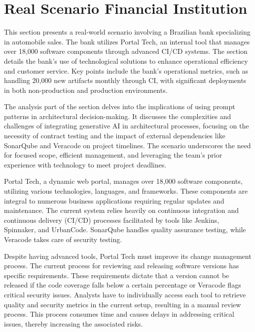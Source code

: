 \section{Real Scenario Financial Institution}
This section presents a real-world scenario involving a Brazilian bank specializing in automobile sales. The bank utilizes Portal Tech, an internal tool that manages over 18,000 software components through advanced CI/CD systems. The section details the bank's use of technological solutions to enhance operational efficiency and customer service. Key points include the bank's operational metrics, such as handling 20,000 new artifacts monthly through CI, with significant deployments in both non-production and production environments.

The analysis part of the section delves into the implications of using prompt patterns in architectural decision-making. It discusses the complexities and challenges of integrating generative AI in architectural processes, focusing on the necessity of contract testing and the impact of external dependencies like SonarQube and Veracode on project timelines. The scenario underscores the need for focused scope, efficient management, and leveraging the team's prior experience with technology to meet project deadlines.


Portal Tech, a dynamic web portal, manages over 18,000 software components, utilizing various technologies, languages, and frameworks. These components are integral to numerous business applications requiring regular updates and maintenance. The current system relies heavily on continuous integration and continuous delivery (CI/CD) processes facilitated by tools like Jenkins, Spinnaker, and UrbanCode. SonarQube handles quality assurance testing, while Veracode takes care of security testing.


Despite having advanced tools, Portal Tech must improve its change management process. The current process for reviewing and releasing software versions has specific requirements. These requirements dictate that a version cannot be released if the code coverage falls below a certain percentage or Veracode flags critical security issues. Analysts have to individually access each tool to retrieve quality and security metrics in the current setup, resulting in a manual review process. This process consumes time and causes delays in addressing critical issues, thereby increasing the associated risks.

